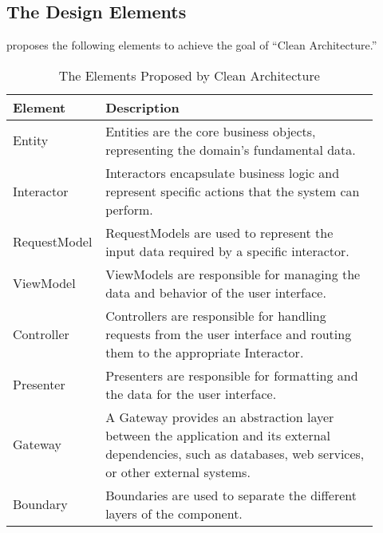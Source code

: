 \subsection{The Design Elements} \label{subsec_design_elements}

\textcite{robert_c_martin_clean_2018} proposes the following elements to achieve
the goal of \enquote{Clean Architecture.}

\begin{table}[H]
    \begin{tabular}{ p{0.17\linewidth} p{0.74\linewidth}}
        \hline
        \textbf{Element} & \textbf{Description} \\ 
        \hline
        Entity & Entities are the core business objects, representing the domain's
        fundamental data.\\ \midrule

        Interactor & Interactors encapsulate business logic and represent specific actions
        that the system can perform. \\ \midrule

        RequestModel & RequestModels are used to represent the input data required by a specific
        interactor.\\ \midrule

        ViewModel & ViewModels are responsible for managing the data and behavior of the
        user interface. \\ \midrule

        Controller & Controllers are responsible for handling requests from the user
        interface and routing them to the appropriate Interactor.\\ \midrule

        Presenter & Presenters are responsible for formatting and the data for the user
        interface.\\ \midrule

        Gateway & A Gateway provides an abstraction layer between the application and its
        external dependencies, such as databases, web services, or other external
        systems.\\ \midrule

        Boundary & Boundaries are used to separate the different layers of the component.\\

        \bottomrule
    \end{tabular}
    \caption{The Elements Proposed by Clean Architecture}
    \label{ca_element}
\end{table}